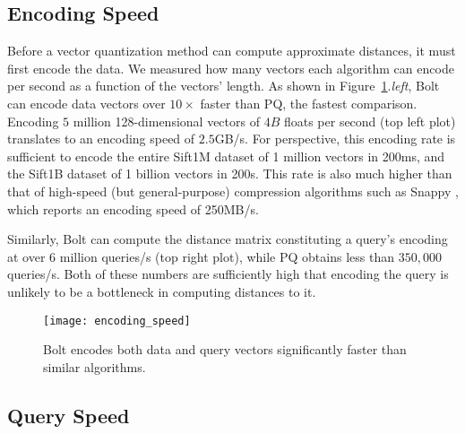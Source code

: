 \subsection{Encoding Speed}

Before a vector quantization method can compute approximate distances, it must first encode the data. We measured how many vectors each algorithm can encode per second as a function of the vectors' length. As shown in Figure~\ref{fig:encoding_speeds}.\textit{left}, Bolt can encode data vectors over $10\times$ faster than PQ, the fastest comparison. Encoding $5$ million 128-dimensional vectors of $4B$ floats per second (top left plot) translates to an encoding speed of $2.5$GB/s. For perspective, this encoding rate is sufficient to encode the entire Sift1M dataset of 1 million vectors in 200ms, and the Sift1B dataset of 1 billion vectors in 200s. This rate is also much higher than that of high-speed (but general-purpose) compression algorithms such as Snappy \cite{snappy}, which reports an encoding speed of 250MB/s.

Similarly, Bolt can compute the distance matrix constituting a query's encoding at over 6 million queries/s (top right plot), while PQ obtains less than $350,000$ queries/s. Both of these numbers are sufficiently high that encoding the query is unlikely to be a bottleneck in computing distances to it.

\begin{figure}[h]
\begin{center}
\texttt{[image: encoding\_speed]}
\vspace*{-2mm}
\caption{Bolt encodes both data and query vectors significantly faster than similar algorithms.}
\label{fig:encoding_speeds}
\end{center}
\end{figure}

\vspace{-2mm}
\subsection{Query Speed}

